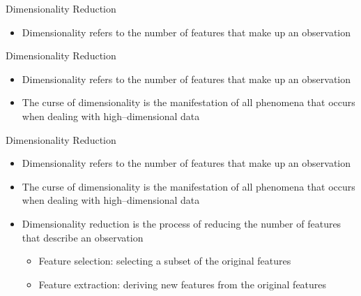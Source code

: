 \begin{frame}{Dimensionality Reduction}
    \begin{itemize}
        \item Dimensionality refers to the number of features that make up an observation
    \end{itemize}
\end{frame}

\begin{frame}{Dimensionality Reduction}
    \begin{itemize}
        \item Dimensionality refers to the number of features that make up an observation
        \item The curse of dimensionality is the manifestation of all phenomena that occurs when dealing with high--dimensional data \cite{article:curse-of-dim}
    \end{itemize}
\end{frame}

\begin{frame}{Dimensionality Reduction}
    \begin{itemize}
        \item Dimensionality refers to the number of features that make up an observation
        \item The curse of dimensionality is the manifestation of all phenomena that occurs when dealing with high--dimensional data \cite{article:curse-of-dim}
        \item Dimensionality reduction is the process of reducing the number of features that describe an observation
            \begin{itemize}
                \item Feature selection: selecting a subset of the original features
                \item Feature extraction: deriving new features from the original features
            \end{itemize}
    \end{itemize}
\end{frame}

